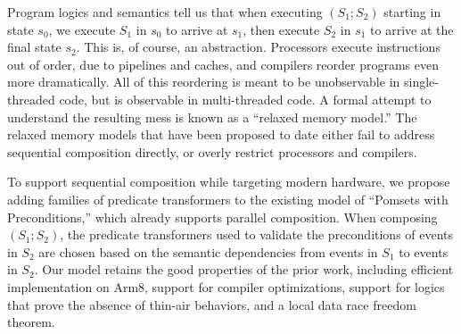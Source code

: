 
Program logics and semantics tell us that when executing $(S_1; S_2)$ starting in state $s_0$,
we execute $S_1$ in $s_0$ to arrive at $s_1$, then execute $S_2$ in $s_1$ to
arrive at the final state $s_2$.  This is, of course, an abstraction.  Processors
execute instructions out of order, due to pipelines and caches, and compilers
reorder programs even more dramatically.  All of this reordering is meant to
be unobservable in single-threaded code, but is observable in multi-threaded code.
A formal attempt to understand the resulting mess is known
as a ``relaxed memory model.''  The relaxed memory models that have been
proposed to date either fail to address sequential composition directly, or overly
restrict processors and compilers.

To support sequential composition while targeting modern hardware, we propose adding families of predicate
transformers to the existing model of ``Pomsets with Preconditions,'' which
already supports parallel composition.  When composing $(S_1;S_2)$, the predicate
transformers used to validate the preconditions of events in $S_2$ are chosen
based on the semantic dependencies from events in $S_1$ to events in $S_2$.  Our model
retains the good properties of the prior work, including efficient
implementation on Arm8, support for compiler optimizations, support for
logics that prove the absence of thin-air behaviors, and a local data race
freedom theorem.


\endinput

